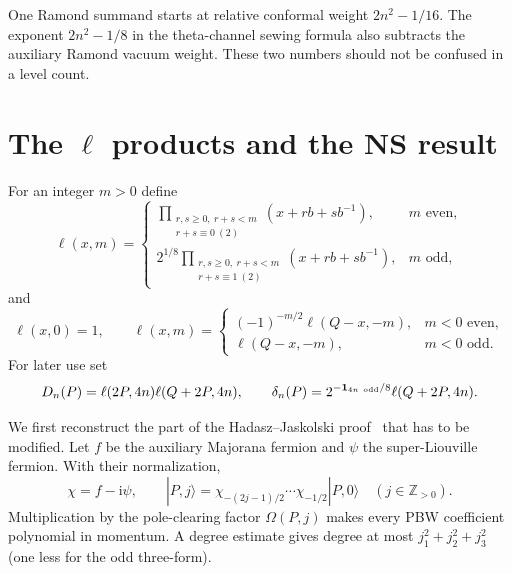 \documentclass[11pt]{article}
\newcommand{\ii}{\mathrm i}
\begin{document}
One Ramond summand starts at relative conformal weight
$2n^2-1/16$.  The exponent $2n^2-1/8$ in the theta-channel sewing formula
also subtracts the auxiliary Ramond vacuum weight.  These two numbers should
not be confused in a level count.

\section{The \texorpdfstring{$\ell$}{ell} products and the NS result}

For an integer $m>0$ define
\begin{equation}
 \ell(x,m)=
 \begin{cases}
 \displaystyle\prod_{\substack{r,s\geq0,\ r+s<m\\r+s\equiv0\ (2)}}
 (x+rb+sb^{-1}),&m\text{ even},\\[8pt]
 \displaystyle2^{1/8}\prod_{\substack{r,s\geq0,\ r+s<m\\r+s\equiv1\ (2)}}
 (x+rb+sb^{-1}),&m\text{ odd},
 \end{cases}
 \label{eq:ell-positive}
\end{equation}
and
\begin{equation}
 \ell(x,0)=1,\qquad
 \ell(x,m)=
 \begin{cases}
 (-1)^{-m/2}\ell(Q-x,-m),&m<0\text{ even},\\
 \ell(Q-x,-m),&m<0\text{ odd}.
 \end{cases}
 \label{eq:ell-negative}
\end{equation}
For later use set
\begin{equation}
 D_n(P)=\ell(2P,4n)\ell(Q+2P,4n),\qquad
 \delta_n(P)=2^{-\mathbf1_{4n\ {\rm odd}}/8}\ell(Q+2P,4n).
 \label{eq:leg-factors}
\end{equation}

We first reconstruct the part of the Hadasz--Jaskolski proof~\cite{HJ} that
has to be modified.  Let $f$ be the auxiliary Majorana fermion and $\psi$ the
super-Liouville fermion.  With their normalization,
\begin{equation}
 \chi=f-\ii\psi,\qquad
 |P,j\rangle=\chi_{-(2j-1)/2}\cdots\chi_{-1/2}|P,0\rangle
 \quad(j\in\mathbb Z_{>0}).
 \label{eq:NS-sea}
\end{equation}
Multiplication by the pole-clearing factor $\Omega(P,j)$ makes every PBW
coefficient polynomial in momentum.  A degree estimate gives degree at most
$j_1^2+j_2^2+j_3^2$ (one less for the odd three-form).
\end{document}

